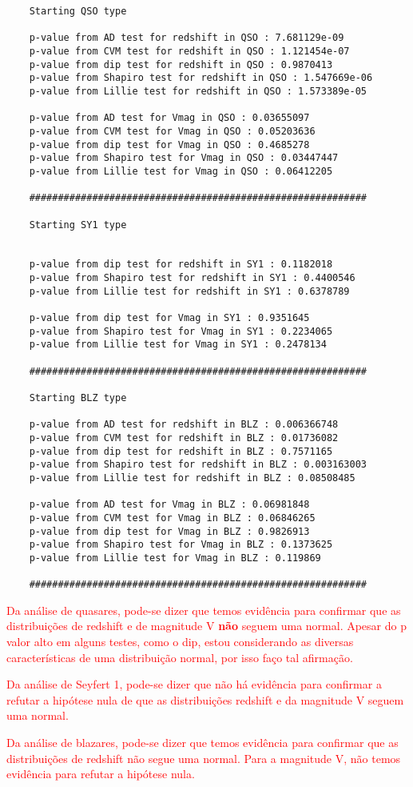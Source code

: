 \begin{lstlisting}
    Starting QSO type
    
    p-value from AD test for redshift in QSO : 7.681129e-09 
    p-value from CVM test for redshift in QSO : 1.121454e-07 
    p-value from dip test for redshift in QSO : 0.9870413 
    p-value from Shapiro test for redshift in QSO : 1.547669e-06 
    p-value from Lillie test for redshift in QSO : 1.573389e-05 
     
    p-value from AD test for Vmag in QSO : 0.03655097 
    p-value from CVM test for Vmag in QSO : 0.05203636 
    p-value from dip test for Vmag in QSO : 0.4685278 
    p-value from Shapiro test for Vmag in QSO : 0.03447447 
    p-value from Lillie test for Vmag in QSO : 0.06412205 
     
    ###########################################################
    
    Starting SY1 type
    

    p-value from dip test for redshift in SY1 : 0.1182018 
    p-value from Shapiro test for redshift in SY1 : 0.4400546 
    p-value from Lillie test for redshift in SY1 : 0.6378789 

    p-value from dip test for Vmag in SY1 : 0.9351645 
    p-value from Shapiro test for Vmag in SY1 : 0.2234065 
    p-value from Lillie test for Vmag in SY1 : 0.2478134 
     
    ###########################################################
    
    Starting BLZ type
    
    p-value from AD test for redshift in BLZ : 0.006366748 
    p-value from CVM test for redshift in BLZ : 0.01736082 
    p-value from dip test for redshift in BLZ : 0.7571165 
    p-value from Shapiro test for redshift in BLZ : 0.003163003 
    p-value from Lillie test for redshift in BLZ : 0.08508485 
     
    p-value from AD test for Vmag in BLZ : 0.06981848 
    p-value from CVM test for Vmag in BLZ : 0.06846265 
    p-value from dip test for Vmag in BLZ : 0.9826913 
    p-value from Shapiro test for Vmag in BLZ : 0.1373625 
    p-value from Lillie test for Vmag in BLZ : 0.119869 
     
    ###########################################################
\end{lstlisting}

\vspace{0.4cm}

\textcolor{red}{Da análise de quasares, pode-se dizer que temos evidência para confirmar que as distribuições de redshift e de magnitude V \textbf{não} seguem uma normal. Apesar do p valor alto em alguns testes, como o dip, estou considerando as diversas características de uma distribuição normal, por isso faço tal afirmação.}

\textcolor{red}{Da análise de Seyfert 1, pode-se dizer que não há evidência para confirmar a refutar a hipótese nula de que as distribuições redshift e da magnitude V seguem uma normal.}

\textcolor{red}{Da análise de blazares, pode-se dizer que temos evidência para confirmar que as distribuições de redshift não segue uma normal. Para a magnitude V, não temos evidência para refutar a hipótese nula.}